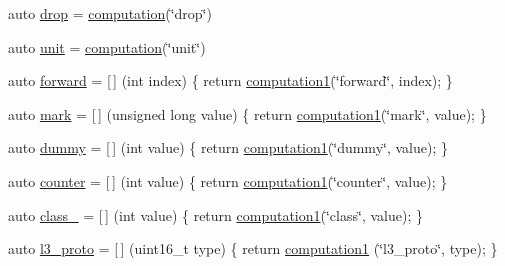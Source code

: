 \begin{DoxyCompactItemize}
\item 
auto \hyperlink{namespacepfq__lang_1_1anonymous__namespace_02default_8hpp_03_abed0412f2864624f755594077d255b1e}{drop} = \hyperlink{namespacepfq__lang_ac0c16097c968653e72c609890dfb4c44}{computation}(\char`\"{}drop\char`\"{})
\item 
auto \hyperlink{namespacepfq__lang_1_1anonymous__namespace_02default_8hpp_03_ae78caafebdc64f9180032a049b7c3b3a}{unit} = \hyperlink{namespacepfq__lang_ac0c16097c968653e72c609890dfb4c44}{computation}(\char`\"{}unit\char`\"{})
\item 
auto \hyperlink{namespacepfq__lang_1_1anonymous__namespace_02default_8hpp_03_a7fbe4b2614dd240727bf1696b4d06523}{forward} = \mbox{[}$\,$\mbox{]} (int index) \{ return \hyperlink{namespacepfq__lang_a58e7e358fc7c95121f74d56c094b1627}{computation1}(\char`\"{}forward\char`\"{}, index); \}
\item 
auto \hyperlink{namespacepfq__lang_1_1anonymous__namespace_02default_8hpp_03_ad6142fe3a0fc859f25ea16956f52a5f0}{mark} = \mbox{[}$\,$\mbox{]} (unsigned long value) \{ return \hyperlink{namespacepfq__lang_a58e7e358fc7c95121f74d56c094b1627}{computation1}(\char`\"{}mark\char`\"{}, value); \}
\item 
auto \hyperlink{namespacepfq__lang_1_1anonymous__namespace_02default_8hpp_03_a876b4be1c6cf97e317f74242d8fb3da4}{dummy} = \mbox{[}$\,$\mbox{]} (int value) \{ return \hyperlink{namespacepfq__lang_a58e7e358fc7c95121f74d56c094b1627}{computation1}(\char`\"{}dummy\char`\"{}, value); \}
\item 
auto \hyperlink{namespacepfq__lang_1_1anonymous__namespace_02default_8hpp_03_a36fc8422d88371c2415438222a71ed11}{counter} = \mbox{[}$\,$\mbox{]} (int value) \{ return \hyperlink{namespacepfq__lang_a58e7e358fc7c95121f74d56c094b1627}{computation1}(\char`\"{}counter\char`\"{}, value); \}
\item 
auto \hyperlink{namespacepfq__lang_1_1anonymous__namespace_02default_8hpp_03_a27a683ef93570a66844e1a0106e6336a}{class\-\_\-} = \mbox{[}$\,$\mbox{]} (int value) \{ return \hyperlink{namespacepfq__lang_a58e7e358fc7c95121f74d56c094b1627}{computation1}(\char`\"{}class\char`\"{}, value); \}
\item 
auto \hyperlink{namespacepfq__lang_1_1anonymous__namespace_02default_8hpp_03_aed01dd5380a873d92397ec0d4c07abac}{l3\-\_\-proto} = \mbox{[}$\,$\mbox{]} (uint16\-\_\-t type) \{ return \hyperlink{namespacepfq__lang_a58e7e358fc7c95121f74d56c094b1627}{computation1} (\char`\"{}l3\-\_\-proto\char`\"{}, type); \}
\item 

\end{DoxyCompactItemize}
